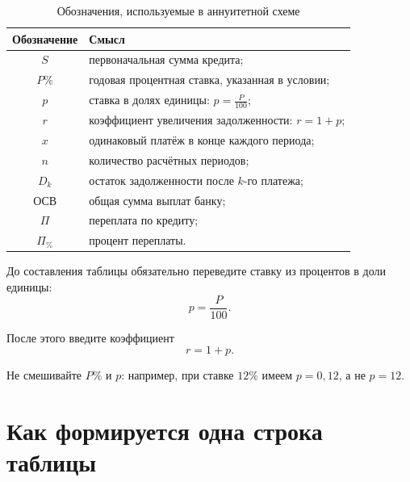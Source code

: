 \documentclass[a4paper,12pt]{article}
\begin{document}
\begin{table}[ht]
  \centering
  \caption{Обозначения, используемые в аннуитетной схеме}
  \renewcommand{\arraystretch}{1.4}
  \begin{tabularx}{\linewidth}{@{}cX@{}}
    \toprule
    \textbf{Обозначение} & \textbf{Смысл} \\
    \midrule
    \(S\) &
    первоначальная сумма кредита; \\

    \(P\%\) &
    годовая процентная ставка, указанная в условии; \\

    \(p\) &
    ставка в долях единицы:
    \(\displaystyle p=\frac{P}{100}\); \\

    \(r\) &
    коэффициент увеличения задолженности:
    \(\displaystyle r=1+p\); \\

    \(x\) &
    одинаковый платёж в конце каждого периода; \\

    \(n\) &
    количество расчётных периодов; \\

    \(D_k\) &
    остаток задолженности после \(k\)-го платежа; \\

    \(\text{ОСВ}\) &
    общая сумма выплат банку; \\

    \(\Pi\) &
    переплата по кредиту; \\

    \(\Pi_{\%}\) &
    процент переплаты. \\
    \bottomrule
  \end{tabularx}
\end{table}

\begin{checklist}
  \item До составления таблицы обязательно переведите ставку из процентов
  в доли единицы:
  \[
  p=\frac{P}{100}.
  \]

  \item После этого введите коэффициент
  \[
  r=1+p.
  \]

  \item Не смешивайте \(P\%\) и \(p\): например, при ставке \(12\%\)
  имеем \(p=0{,}12\), а не \(p=12\).
\end{checklist}

\section{Как формируется одна строка таблицы}
\end{document}

